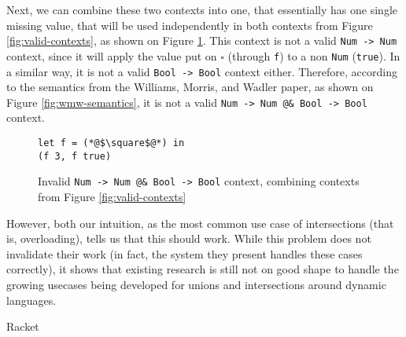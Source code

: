 \documentclass[sigplan,10pt,review,anonymous]{acmart}
\newcommand{\resolved}[2]{}
\newcommand{\nickel}[1]{\lstinline[language=nickel]{#1}}
\begin{document}
Next, we can combine these two contexts into one, that essentially
has one single missing value, that will be used independently in both contexts
from Figure \ref{fig:valid-contexts}, as shown on Figure \ref{fig:invalid-context}.
This context is not a valid \nickel{Num -> Num} context, since it will apply
the value put on $\square$ (through \nickel{f}) to a non \nickel{Num} (\nickel{true}).
In a similar way, it is not a valid \nickel{Bool -> Bool} context either.
Therefore, according to the semantics from the Williams, Morris, and Wadler paper, as
shown on Figure \ref{fig:wmw-semantics}, it is not a valid
\nickel{Num -> Num @& Bool -> Bool} context.

\begin{figure}[h]
\begin{lstlisting}[language=nickel]
let f = (*@$\square$@*) in
(f 3, f true)
\end{lstlisting}
\caption{Invalid \nickel{Num -> Num @& Bool -> Bool} context,
combining contexts from Figure \ref{fig:valid-contexts}}
\label{fig:invalid-context}
\end{figure}

However, both our intuition, as the most common use case of intersections
(that is, overloading), tells us that this should work.
While this problem does not invalidate their work (in fact, the system they present
handles these cases correctly), it shows that existing research is still not on
good shape to handle the growing usecases being developed for
unions and intersections around dynamic languages.





\resolved{(Yann) Maybe adding a concrete example of this (it can be the same term but with
    concrete types like Number and String and simple contexts like application
    to a dumb argument) is sufficient to make the point}

\subsection{Racket}
\label{sec:racket}
\end{document}
